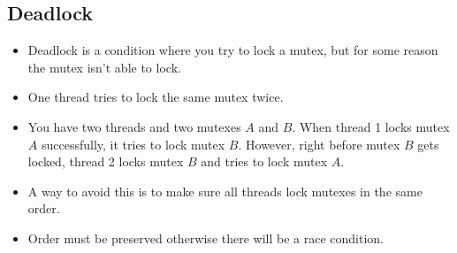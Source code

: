 \documentclass[]{article}
\begin{document}
\subsection{Deadlock}
\begin{itemize}
\item Deadlock is a condition where you try to lock a mutex, but for some reason
the mutex isn't able to lock.
\item One thread tries to lock the same mutex twice.
\item You have two threads and two mutexes $A$ and $B$. When thread 1 locks
mutex $A$ successfully, it tries to lock mutex $B$. However, right before mutex
$B$ gets locked, thread 2 locks mutex $B$ and tries to lock mutex $A$.
\item A way to avoid this is to make sure all threads lock mutexes in the same
order.
\item Order must be preserved otherwise there will be a race condition.
\end{itemize}
\end{document}

